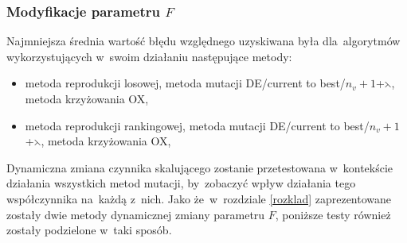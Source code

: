 \subsubsection{Modyfikacje parametru $F$}\label{modF}

Najmniejsza średnia wartość błędu względnego uzyskiwana była dla~algorytmów wykorzystujących w~swoim działaniu następujące metody:\\
\begin{itemize}
\item metoda reprodukcji losowej, metoda mutacji DE/current to best/$n_{v}+1$+$\leftthreetimes$, metoda krzyżowania OX,\\
\item metoda reprodukcji rankingowej, metoda mutacji DE/current to best/$n_{v}+1$+$\leftthreetimes$, metoda krzyżowania OX,\\
\end{itemize}
Dynamiczna zmiana czynnika skalującego zostanie przetestowana w~kontekście działania wszystkich metod mutacji, by~zobaczyć wpływ działania tego współczynnika na~każdą z~nich. Jako że~w~rozdziale \ref{rozklad} zaprezentowane zostały dwie metody dynamicznej zmiany parametru $F$, poniższe testy również zostały podzielone w~taki sposób.
